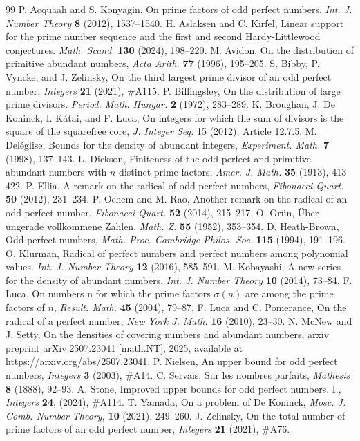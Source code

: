 \documentclass[12pt,reqno]{article}
\theoremstyle{plain}
\theoremstyle{definition}
\theoremstyle{remark}
\begin{document}
\begin{thebibliography}{99}
  P. Acquaah and S. Konyagin, On prime factors of odd perfect numbers, \textit{Int. J. Number Theory} \textbf{8} (2012),  1537--1540.
 H. Aslaksen and C. Kirfel,
Linear support for the prime number sequence and the first and second Hardy-Littlewood conjectures. 
\textit{Math. Scand.}\textbf{ 130} (2024),  198--220.
 M. Avidon,  On the distribution of primitive abundant numbers, {\it Acta Arith.}  \textbf{77} (1996), 195--205.
 S. Bibby, P.  Vyncke, and J. Zelinsky, 
On the third largest prime divisor of an odd perfect number, \textit{Integers} \textbf{21} (2021), \#A115.  
 P. Billingsley,  On the distribution of large prime divisors. {\it Period. Math. Hungar.} \textbf{2} (1972), 283--289.
 K. Broughan, J. De Koninck, I. K\'{a}tai, and F. Luca, On integers for which the sum of divisors is the square of the squarefree core, \textit{J. Integer Seq.} 15 (2012), Article 12.7.5.
 M. Del\'eglise,  Bounds for the density of abundant integers, {\it Experiment. Math.} \textbf{7}  (1998),  137--143.
 L.  Dickson,  Finiteness of the odd perfect and primitive abundant numbers with $n$ distinct prime factors, {\it Amer. J. Math.} \textbf{35} (1913), 413--422.
 P. Ellia, A remark on the radical of odd perfect numbers, 
\textit{Fibonacci Quart.} \textbf{50} (2012), 231--234.
 P. Ochem and M. Rao, 
Another remark on the radical of an odd perfect number, \textit{Fibonacci Quart.} \textbf{52} (2014), 215--217.
  O. Gr{\"u}n,  {\"U}ber ungerade vollkommene Zahlen, {\it Math. Z.} {\bf 55} (1952), 353--354.
 D. Heath-Brown,  Odd perfect numbers,
\textit{Math. Proc. Cambridge Philos. Soc.} \textbf{115} (1994),  191--196.
 O. Klurman, 
Radical of perfect numbers and perfect numbers among polynomial values.
\textit{Int. J. Number Theory }\textbf{12} (2016), 585--591.
 M. Kobayashi,  A new series for the density of abundant numbers.  {\it Int. J. Number Theory} \textbf{10}  (2014),  73--84.
 F. Luca, On numbers n for which the prime factors $\sigma(n)$ are among the prime factors of $n$, \textit{Result. Math.} \textbf{45} (2004), 79--87.
 F. Luca and C. Pomerance, On the radical of a perfect number, \textit{New York J. Math.} \textbf{16} (2010), 23--30.
 N. McNew and J. Setty, On the densities of covering numbers and abundant numbers, arxiv preprint arXiv:2507.23041 [math.NT], 2025, available at {\url{https://arxiv.org/abs/2507.23041}}.
 P. Nielsen, An upper bound for odd perfect numbers, \textit{Integers} \textbf{3} (2003), \#A14.
 C. Servais, Sur les nombres parfaits, {\it Mathesis} {\bf 8} (1888), 92--93.
  A. Stone, Improved upper bounds for odd perfect numbers. I., {\it{Integers}} \textbf{24}, (2024), \#A114.
 T. Yamada, On a problem of De Koninck, 
\textit{Mosc. J. Comb. Number Theory,} {\bf 10} (2021), 249--260. 
  J. Zelinsky, On the total number of prime factors of an odd perfect number, {\it Integers} {\bf 21} (2021), \#A76.


\end{thebibliography}
\end{document}
